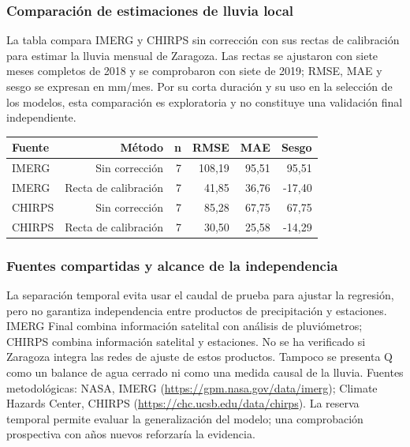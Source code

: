 \documentclass[10pt,a4paper]{article}
\begin{document}
\subsubsection*{Comparación de estimaciones de lluvia local}
La tabla compara IMERG y CHIRPS sin corrección con sus rectas de calibración para estimar la lluvia mensual de Zaragoza. Las rectas se ajustaron con siete meses completos de 2018 y se comprobaron con siete de 2019; RMSE, MAE y sesgo se expresan en mm/mes. Por su corta duración y su uso en la selección de los modelos, esta comparación es exploratoria y no constituye una validación final independiente.
\begin{center}\small\begin{tabular}{lrrrrr}\hline
Fuente & Método & n & RMSE & MAE & Sesgo \\ \hline
IMERG & Sin corrección & 7 & 108,19 & 95,51 & 95,51 \\
IMERG & Recta de calibración & 7 & 41,85 & 36,76 & -17,40 \\
CHIRPS & Sin corrección & 7 & 85,28 & 67,75 & 67,75 \\
CHIRPS & Recta de calibración & 7 & 30,50 & 25,58 & -14,29 \\
\hline\end{tabular}\end{center}
\subsubsection*{Fuentes compartidas y alcance de la independencia}
La separación temporal evita usar el caudal de prueba para ajustar la regresión, pero no garantiza independencia entre productos de precipitación y estaciones. IMERG Final combina información satelital con análisis de pluviómetros; CHIRPS combina información satelital y estaciones. No se ha verificado si Zaragoza integra las redes de ajuste de estos productos. Tampoco se presenta Q como un balance de agua cerrado ni como una medida causal de la lluvia. Fuentes metodológicas: NASA, IMERG (\url{https://gpm.nasa.gov/data/imerg}); Climate Hazards Center, CHIRPS (\url{https://chc.ucsb.edu/data/chirps}). La reserva temporal permite evaluar la generalización del modelo; una comprobación prospectiva con años nuevos reforzaría la evidencia.
\end{document}
